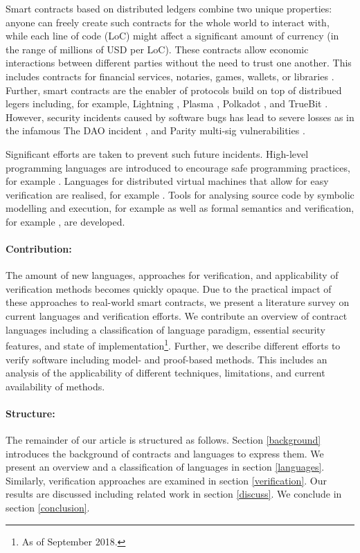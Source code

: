 \documentclass{llncs}
\begin{document}
Smart contracts based on distributed ledgers combine two unique properties: anyone can freely create such contracts for the whole world to interact with, while each line of code (LoC) might affect a significant amount of currency (in the range of millions of USD per LoC).
These contracts allow economic interactions between different parties without the need to trust one another.
This includes contracts for financial services, notaries, games, wallets, or libraries \cite{Bartoletti2017}.
Further, smart contracts are the enabler of protocols build on top of distribued legers including, for example, Lightning \cite{Poon2016}, Plasma \cite{Poon2017}, Polkadot \cite{Wood2017}, and TrueBit \cite{Teutsch2017}.
However, security incidents caused by software bugs has lead to severe losses as in the infamous The DAO incident \cite{Daian2016}, and Parity multi-sig vulnerabilities \cite{Breidenbach2017Parity,ParityTech2017}. 


Significant efforts are taken to prevent such future incidents. 
High-level programming languages are introduced to encourage safe programming practices, for example  \cite{Hirai2018Bamboo,Ethereum2018Vyper,Schrans2018}.
Languages for distributed virtual machines that allow for easy verification are realised, for example \cite{Sergey2018,DynamicLedgerSolutions2017,Popejoy2017,Kasampalis2018}.
Tools for analysing source code by symbolic modelling and execution, for example \cite{Luu2016,Tsankov2017,Kalra2018,Albert2018} as well as formal semantics and verification, for example \cite{Bhargavan2016,Hildenbrandt2017,Hirai2017}, are developed.

\paragraph{Contribution:} The amount of new languages, approaches for verification, and applicability of verification methods becomes quickly opaque. Due to the practical impact of these approaches to real-world smart contracts, we present a literature survey on current languages and verification efforts.
We contribute an overview of contract languages including a classification of language paradigm, essential security features, and state of implementation\footnote{As of September 2018.}.
Further, we describe different efforts to verify software including model- and proof-based methods. This includes an analysis of the applicability of different techniques, limitations, and current availability of methods.

\paragraph{Structure:} The remainder of our article is structured as follows. Section \ref{background} introduces the background of contracts and languages to express them. We present an overview and a classification of languages in section \ref{languages}. Similarly, verification approaches are examined in section \ref{verification}. Our results are discussed including related work in section \ref{discuss}. We conclude in section \ref{conclusion}.
\end{document}
